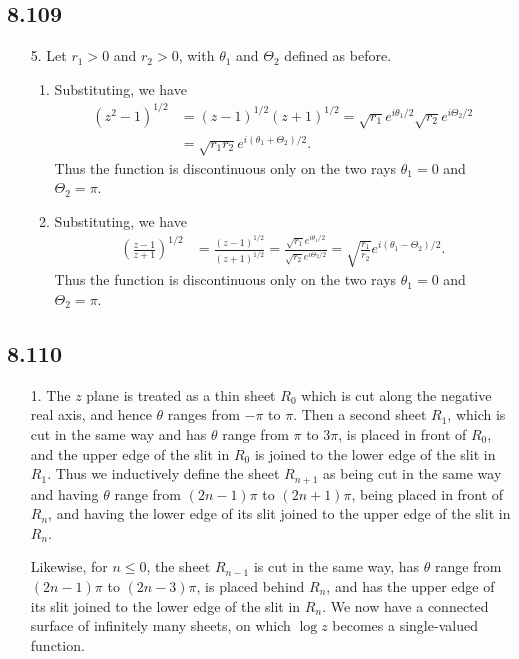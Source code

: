 \documentclass[a4paper,12pt]{article}
\begin{document}
\subsection*{8.109}
\begin{enumerate}
    \item[5.]
        Let $r_1 > 0$ and $r_2 > 0$, with $\theta_1$ and $\Theta_2$ defined as before.
        \begin{enumerate}
            \item
                Substituting, we have
                \begin{align*}
                    (z^2 - 1)^{1/2} &= (z - 1)^{1/2} (z + 1)^{1/2} = \sqrt{r_1} e^{i\theta_1/2} \sqrt{r_2} e^{i\Theta_2/2} \\
                    &= \sqrt{r_1 r_2} e^{i(\theta_1 + \Theta_2)/2}.
                \end{align*}
                Thus the function is discontinuous only on the two rays $\theta_1 = 0$ and $\Theta_2 = \pi$.

            \item
                Substituting, we have
                \begin{align*}
                    \left( \frac{z - 1}{z + 1} \right)^{1/2} &= \frac{(z - 1)^{1/2}}{(z + 1)^{1/2}} = \frac{\sqrt{r_1} e^{i\theta_1/2}}{\sqrt{r_2} e^{i\Theta_2/2}} = \sqrt{\frac{r_1}{r_2}} e^{i(\theta_1 - \Theta_2)/2}.
                \end{align*}
                Thus the function is discontinuous only on the two rays $\theta_1 = 0$ and $\Theta_2 = \pi$.
        \end{enumerate}
\end{enumerate}

\subsection*{8.110}
\begin{enumerate}
    \item[1.]
        The $z$ plane is treated as a thin sheet $R_0$ which is cut along the negative real axis, and hence $\theta$ ranges from $-\pi$ to $\pi$. Then a second sheet $R_1$, which is cut in the same way and has $\theta$ range from $\pi$ to $3\pi$, is placed in front of $R_0$, and the upper edge of the slit in $R_0$ is joined to the lower edge of the slit in $R_1$. Thus we inductively define the sheet $R_{n + 1}$ as being cut in the same way and having $\theta$ range from $(2n - 1)\pi$ to $(2n + 1)\pi$, being placed in front of $R_n$, and having the lower edge of its slit joined to the upper edge of the slit in $R_n$. \par
        Likewise, for $n \leq 0$, the sheet $R_{n - 1}$ is cut in the same way, has $\theta$ range from $(2n - 1)\pi$ to $(2n - 3)\pi$, is placed behind $R_n$, and has the upper edge of its slit joined to the lower edge of the slit in $R_n$. We now have a connected surface of infinitely many sheets, on which $\log z$ becomes a single-valued function.
\end{enumerate}
\end{document}
